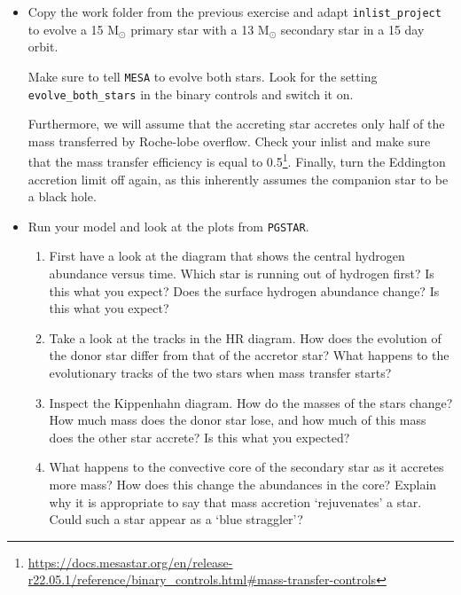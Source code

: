 \documentclass[11pt,a4paper]{article}
\begin{document}
\begin{itemize}
\item Copy the work folder from the previous exercise and adapt \verb|inlist_project| to evolve a 15 M$_\odot$ primary star with a 13 M$_\odot$ secondary star in a 15 day orbit. 

Make sure to tell \texttt{MESA} to evolve both stars. 
Look for the setting \verb|evolve_both_stars| in the binary controls and switch it on. 

Furthermore, we will assume that the accreting star accretes only half of the mass transferred by Roche-lobe overflow. Check your inlist and make sure that the mass transfer efficiency is equal to 0.5\footnote{\url{https://docs.mesastar.org/en/release-r22.05.1/reference/binary_controls.html\#mass-transfer-controls}}. Finally, turn the Eddington accretion limit off again, as this inherently assumes the companion star to be a black hole.

\item Run your model and look at the plots from \texttt{PGSTAR}.

\begin{enumerate}
\item First have a look at the diagram that shows the central hydrogen abundance versus time. Which star is running out of hydrogen first? Is this what you expect? Does the surface hydrogen abundance change? Is this what you expect?

\item Take a look at the tracks in the HR diagram. How does the evolution of the donor star differ from that of the accretor star? What happens to the evolutionary tracks of the two stars when mass transfer starts?

\item Inspect the Kippenhahn diagram. How do the masses of the stars change? How much mass does the donor star lose, and how much of this mass does the other star accrete? Is this what you expected? 
\item What happens to the convective core of the secondary star as it accretes more mass? How does this change the abundances in the core? Explain why it is appropriate to say that mass accretion `rejuvenates' a star. Could such a star appear as a `blue straggler'?
\end{enumerate}

\end{itemize}






% 
% 
\end{document}
